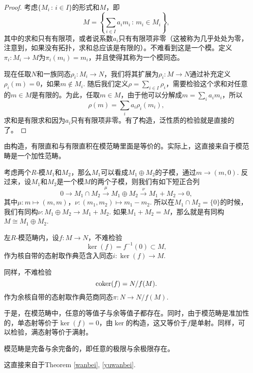 \begin{proof}
考虑$\{M_i\,:\, i\in I\}$的形式和$M$，即
\[
	M=\left\{\sum_{i\in I} a_i m_i\,:\, m_i\in M_i\right\},
\]
其中的求和只有有限项，或者说系数$a_i$只有有限项非零（这被称为几乎处处为零，注意到，如果没有拓扑，求和总应该是有限的）。不难看到这是一个模。定义$\pi_i:M_i\to M$为$\pi_i(m_i)=m_i$，并且使得其称为一个模同态。

现在任取$N$和一族同态$\rho_i:M_i\to N$，我们将其扩展为$\rho_i:M\to N$通过补充定义$\rho_i(m)=0$，如果$m\notin M_i$. 随后我们定义$\rho = \sum_{i\in I} \rho_i$，需要检验这个求和对任意的$m\in M$是有限的。为此，任取$m\in M$，由于他可以分解成$m=\sum_i a_i m_i$，所以
\[
	\rho(m)=\sum_i a_i \rho_i(m_i),
\]
求和是有限求和因为$a_i$只有有限项非零。有了构造，泛性质的检验就是直接的了。
\end{proof}

由构造，有限直和与有限直积在模范畴里面是等价的。实际上，这直接来自于模范畴是一个加性范畴。

\begin{para}
考虑两个$R$-模$M_1$和$M_2$，那么$M_1$可以看成$M_1\oplus M_2$的子模，通过$m\to (m,0)$. 反过来，设$M_1$和$M_2$是一个模$M$的两个子模，则我们有如下短正合列
\[
	0\to M_1\cap M_2 \xrightarrow{\mu} M_1\oplus M_2\xrightarrow{\nu} M_1+M_2\to 0,
\]
其中$\mu:m\mapsto (m,m)$，$\nu:(m_1,m_2)\mapsto m_1-m_2$. 所以在$M_1\cap M_2=\{0\}$的时候，我们有同构$\nu: M_1\oplus M_2\to M_1+M_2$. 如果$M_1+M_2=M$，那么就是有同构$M\cong M_1\oplus M_2$.
\end{para}


\begin{para}[核与余核]
左$R$-模范畴内，设$f:M\to N$，不难检验
\[
	\ker(f)=f^{-1}(0)\subset M,
\]
作为核自带的态射取作典范含入同态$i:\ker(f)\to M$.

同样，不难检验
\[
	\operatorname{coker}(f)=N/f(M).
\]
作为余核自带的态射取作典范商同态$\pi:N\to N/f(M)$.
\end{para}

于是，在模范畴中，任意的等值子与余等值子都存在。同时，由于模范畴是准加性的，单态射等价于$\ker(f)=0$，由$\ker$的构造，这又等价于$f$是单射。同样，可以检验，满态射等价于满射。

\begin{thm}
模范畴是完备与余完备的，即任意的极限与余极限存在。
\end{thm}

这直接来自于Theorem \ref{wanbei}, \ref{yuwanbei}.

